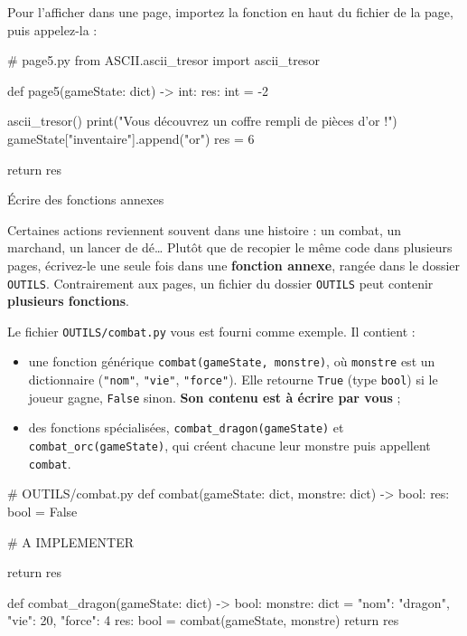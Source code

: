 \documentclass[11pt,a4paper]{article}
\makeatletter
\renewcommand\section{\@startsection{section}{1}{0pt}{1.6em}{0.8em}%
  {\Large\bfseries\color{nuit}}}
\newcommand{\fichier}[1]{\texttt{\color{nuit}#1}}
\makeatother
\begin{document}

Pour l'afficher dans une page, importez la fonction en haut du fichier de la page, puis
appelez-la :

\begin{code}
# page5.py
from ASCII.ascii_tresor import ascii_tresor


def page5(gameState: dict) -> int:
    res: int = -2

    ascii_tresor()
    print("Vous découvrez un coffre rempli de pièces d'or !")
    gameState["inventaire"].append("or")
    res = 6

    return res
\end{code}

\section{Écrire des fonctions annexes}

Certaines actions reviennent souvent dans une histoire : un combat, un marchand, un
lancer de dé\dots{} Plutôt que de recopier le même code dans plusieurs pages, écrivez-le
une seule fois dans une \textbf{fonction annexe}, rangée dans le dossier
\fichier{OUTILS}. Contrairement aux pages, un fichier du dossier \fichier{OUTILS} peut
contenir \textbf{plusieurs fonctions}.

Le fichier \fichier{OUTILS/combat.py} vous est fourni comme exemple. Il contient :
\begin{itemize}
  \item une fonction générique \texttt{combat(gameState, monstre)}, où \texttt{monstre}
        est un dictionnaire (\texttt{"nom"}, \texttt{"vie"}, \texttt{"force"}). Elle
        retourne \texttt{True} (type \texttt{bool}) si le joueur gagne, \texttt{False} sinon.
        \textbf{Son contenu est à écrire par vous} ;
  \item des fonctions spécialisées, \texttt{combat\_dragon(gameState)} et
        \texttt{combat\_orc(gameState)}, qui créent chacune leur monstre puis appellent
        \texttt{combat}.
\end{itemize}

\begin{code}
# OUTILS/combat.py
def combat(gameState: dict, monstre: dict) -> bool:
    res: bool = False

    # A IMPLEMENTER

    return res


def combat_dragon(gameState: dict) -> bool:
    monstre: dict = {"nom": "dragon", "vie": 20, "force": 4}
    res: bool = combat(gameState, monstre)
    return res
\end{code}
\end{document}
